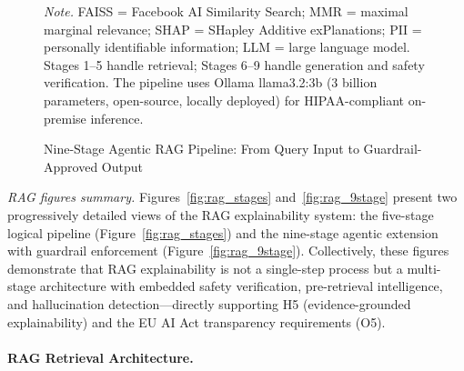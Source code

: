 \begin{figure}[!htbp]
{%
}
\caption[Agentic RAG Pipeline (9 Stages)]{Nine-Stage Agentic RAG Pipeline: From Query Input to Guardrail-Approved Output}
\label{app_fig:rag_9stage}
\vspace{0.5em}\noindent\textit{Note.} FAISS = Facebook AI Similarity Search; MMR = maximal marginal relevance; SHAP = SHapley Additive exPlanations; PII = personally identifiable information; LLM = large language model. Stages 1--5 handle retrieval; Stages 6--9 handle generation and safety verification. The pipeline uses Ollama llama3.2:3b (3 billion parameters, open-source, locally deployed) for HIPAA-compliant on-premise inference.
\end{figure}

\noindent\textit{RAG figures summary.} Figures~\ref{fig:rag_stages} and~\ref{fig:rag_9stage} present two progressively detailed views of the RAG explainability system: the five-stage logical pipeline (Figure~\ref{fig:rag_stages}) and the nine-stage agentic extension with guardrail enforcement (Figure~\ref{fig:rag_9stage}). Collectively, these figures demonstrate that RAG explainability is not a single-step process but a multi-stage architecture with embedded safety verification, pre-retrieval intelligence, and hallucination detection---directly supporting H5 (evidence-grounded explainability) and the EU AI Act transparency requirements (O5).

\paragraph{RAG Retrieval Architecture.}

